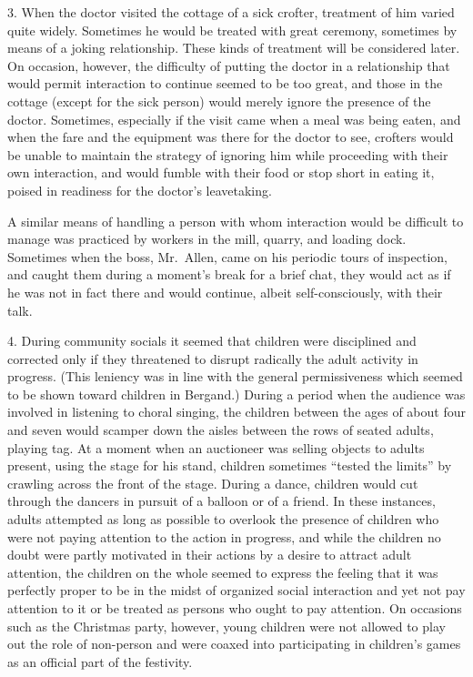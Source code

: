\documentclass[twoside,symmetric,nobib,justified]{tufte-book}
\begin{document}
3. When the doctor visited the cottage of a sick crofter, treatment of
him varied quite widely. Sometimes he would be treated with great
ceremony, sometimes by means of a joking relationship. These kinds of
treatment will be considered later. On occasion, however, the difficulty
of putting the doctor in a relationship that would permit interaction to
continue seemed to be too great, and those in the cottage (except for
the sick person) would merely ignore the presence of the doctor.
Sometimes, especially if the visit came when a meal was being eaten, and
when the fare and the equipment was there for the doctor to see,
crofters would be unable to maintain the strategy of ignoring him while
proceeding with their own interaction, and would fumble with their food
or stop short in eating it, poised in readiness for the doctor's
leavetaking.

A similar means of handling a person with whom interaction would be
difficult to manage was practiced by workers in the mill, quarry, and
loading dock. Sometimes when the boss, Mr.~Allen, came on his periodic
tours of inspection, and caught them during a moment's break for a brief
chat, they would act as if he was not in fact there and would continue,
albeit self-consciously, with their talk.

4. During community socials it seemed that children were disciplined and
corrected only if they threatened to disrupt radically the adult
activity in progress. (This leniency was in line with the general
permissiveness which seemed to be shown toward children in Bergand.)
During a period when the audience was involved in listening to choral
singing, the children between the ages of about four and seven would
scamper down the aisles between the rows of seated adults, playing tag.
At a moment when an auctioneer was selling objects to adults present,
using the stage for his stand, children sometimes ``tested the limits''
by crawling across the front of the stage. During a dance, children
would cut through the dancers in pursuit of a balloon or of a friend. In
these instances, adults attempted as long as possible to overlook the
presence of children who were not paying attention to the action in
progress, and while the children no doubt were partly motivated in their
actions by a desire to attract adult attention, the children on the
whole seemed to express the feeling that it was perfectly proper to be
in the midst of organized social interaction and yet not pay attention
to it or be treated as persons who ought to pay attention. On occasions
such as the Christmas party, however, young children were not allowed to
play out the role of non-person and were coaxed into participating in
children's games\\\noindent as an official part of the festivity.
\end{document}
